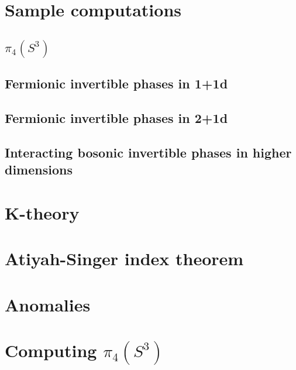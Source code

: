 \documentclass[12pt]{article}
\numberwithin{equation}{section}
\numberwithin{figure}{section}
\theoremstyle{remark}
\begin{document}
\goodbreak


\section{Sample computations}

\subsection{$\pi_4(S^3)$}

\subsection{Fermionic invertible phases in 1+1d}

\subsection{Fermionic invertible phases in 2+1d}

\subsection{Interacting bosonic invertible phases in higher dimensions}



\section{K-theory}

\section{Atiyah-Singer index theorem}

\section{Anomalies}

\section{Computing \texorpdfstring{$\pi_4(S^3)$}{pi4(S3)}}
\fi



\end{document}
